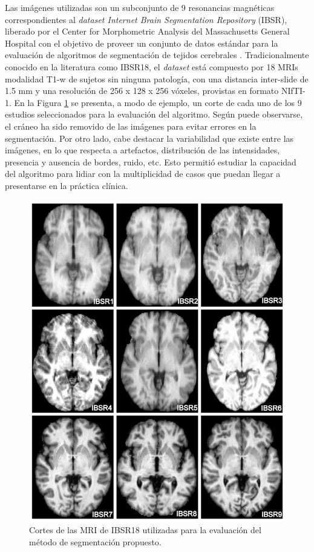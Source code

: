 Las imágenes utilizadas son un subconjunto de 9 resonancias magnéticas correspondientes al \emph{dataset Internet Brain Segmentation Repository} (IBSR), liberado por el Center for Morphometric Analysis del Massachusetts General Hospital con el objetivo de proveer un conjunto de datos estándar para la evaluación de algoritmos de segmentación de tejidos cerebrales \citep{rohlfing2012image, valverde2015comparison}. Tradicionalmente conocido en la literatura como IBSR18, el \emph{dataset} está compuesto por 18 MRIs modalidad T1-w de sujetos sin ninguna patología, con una distancia inter-slide de 1.5 mm y una resolución de 256 x 128 x 256 vóxeles, provistas en formato NIfTI-1. En la Figura \ref{fig:ISBR18} se presenta, a modo de ejemplo, un corte de cada uno de los 9 estudios seleccionados para la evaluación del algoritmo. Según puede observarse, el cráneo ha sido removido de las imágenes para evitar errores en la segmentación. Por otro lado, cabe destacar la variabilidad que existe entre las imágenes, en lo que respecta a artefactos, distribución de las intensidades, presencia y ausencia de bordes, ruido, etc. Esto permitió estudiar la capacidad del algoritmo para lidiar con la multiplicidad de casos que puedan llegar a presentarse en la práctica clínica.

\begin{figure}[H]
	\centering
	\includegraphics[scale=0.6]{images/IBSRsx9.jpg}
	\caption{Cortes de las MRI de IBSR18 utilizadas para la evaluación del método de segmentación propuesto.}
	\label{fig:ISBR18}
\end{figure}


